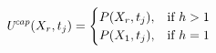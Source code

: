 \documentclass{article}
\begin{document}
  \begin{equation}
\text{\emph{U\textsuperscript{cap}}}(X_r, t_j) =\begin{cases}
              P(X_r, t_j), & \text{if $ h > 1$}\\
              P(X_1, t_j), & \text{if $ h = 1$}
\end{cases}
\end{equation}
\end{document}
